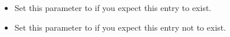 
\begin{itemize}
\item Set this parameter to  if you expect this entry to exist. 
\item Set this parameter to  if you expect this entry not to exist. 
\end{itemize}

